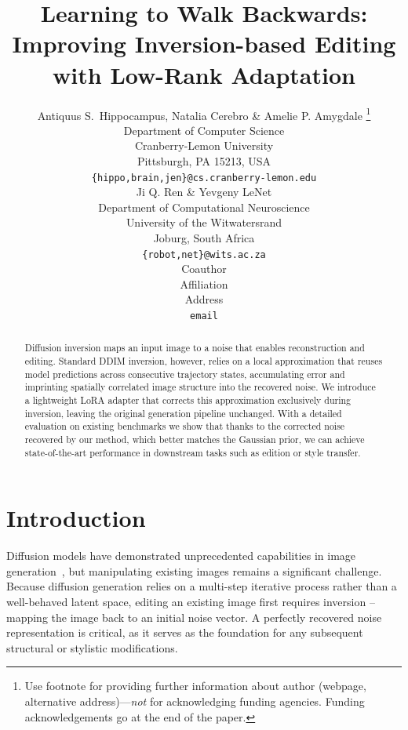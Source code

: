 \documentclass{article} %
\title{Learning to Walk Backwards: \\Improving Inversion-based Editing with Low-Rank Adaptation \kamil{We should work on this}}
\author{Antiquus S.~Hippocampus, Natalia Cerebro \& Amelie P. Amygdale \thanks{ Use footnote for providing further information
about author (webpage, alternative address)---\emph{not} for acknowledging
funding agencies.  Funding acknowledgements go at the end of the paper.} \\
Department of Computer Science\\
Cranberry-Lemon University\\
Pittsburgh, PA 15213, USA \\
\texttt{\{hippo,brain,jen\}@cs.cranberry-lemon.edu} \\
\And
Ji Q. Ren \& Yevgeny LeNet \\
Department of Computational Neuroscience \\
University of the Witwatersrand \\
Joburg, South Africa \\
\texttt{\{robot,net\}@wits.ac.za} \\
\AND
Coauthor \\
Affiliation \\
Address \\
\texttt{email}
}
\begin{document}
\maketitle

\begin{abstract}
Diffusion inversion maps an input image to a noise that enables reconstruction and editing. Standard DDIM inversion, however, relies on a local approximation that reuses model predictions across consecutive trajectory states, accumulating error and imprinting spatially correlated image structure into the recovered noise. We introduce a lightweight LoRA adapter that corrects this approximation exclusively during inversion, leaving the original generation pipeline unchanged. With a detailed evaluation on existing benchmarks we show that thanks to the corrected noise recovered by our method, which better matches the Gaussian prior, we can achieve state-of-the-art performance in downstream tasks such as edition or style transfer.

\end{abstract}



\section{Introduction}

Diffusion models have demonstrated unprecedented capabilities in image generation~\citep{sohl2015deep, dhariwal2021diffusion}, but manipulating existing images remains a significant challenge. Because diffusion generation relies on a multi-step iterative process rather than a well-behaved latent space, editing an existing image first requires inversion -- mapping the image back to an initial noise vector. A perfectly recovered noise representation is critical, as it serves as the foundation for any subsequent structural or stylistic modifications.
\end{document}
